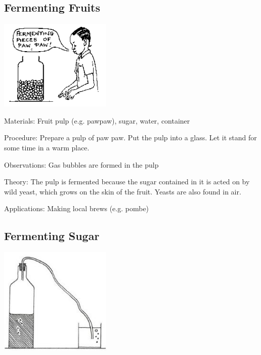 \begin{multicols}{2}
\columnbreak

\subsection{Fermenting Fruits}  %

\begin{center}
\includegraphics[width=0.4\textwidth]{./img/source/fermenting-fruits.png}
\end{center}

\begin{description*}
\item[Materials:]{Fruit pulp (e.g. pawpaw), sugar, water, container}
\item[Procedure:]{Prepare a pulp of paw paw. Put the pulp into a glass. Let it stand for some time in a warm
place.}
\item[Observations:]{Gas bubbles are formed in the pulp}
\item[Theory:]{The pulp is fermented because the sugar contained in it is acted on by wild yeast, which
grows on the skin of the fruit. Yeasts are also found in air.}
\item[Applications:]{Making local brews (e.g. pombe)}
\end{description*}

\subsection{Fermenting Sugar}

\begin{center}
\includegraphics[width=0.4\textwidth]{./img/vso/fermentation.jpg}
\end{center}


\end{multicols}
